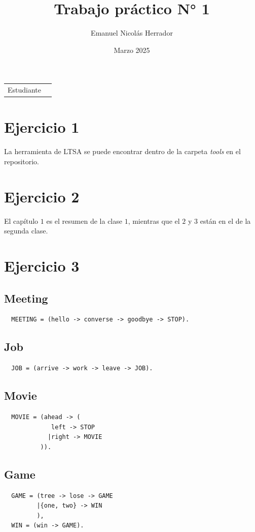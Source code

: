 \documentclass{article}
\title{Trabajo práctico N° 1}
\author{Emanuel Nicolás Herrador}
\date{Marzo 2025}
\begin{document}
\maketitle

\noindent\begin{tabular}{@{}ll}
	Estudiante & \theauthor \\
\end{tabular}

\section*{Ejercicio 1}
La herramienta de LTSA se puede encontrar dentro de la carpeta \textit{tools} en el repositorio.

\section*{Ejercicio 2}
El capítulo $1$ es el resumen de la clase $1$, mientras que el $2$ y $3$ están en el de la segunda clase.

\section*{Ejercicio 3}
\subsection*{Meeting}
\begin{verbatim}
  MEETING = (hello -> converse -> goodbye -> STOP).
\end{verbatim}

\subsection*{Job}
\begin{verbatim}
  JOB = (arrive -> work -> leave -> JOB).
\end{verbatim}

\subsection*{Movie}
\begin{verbatim}
  MOVIE = (ahead -> (
             left -> STOP
            |right -> MOVIE
          )).
\end{verbatim}

\subsection*{Game}
\begin{verbatim}
  GAME = (tree -> lose -> GAME
         |{one, two} -> WIN
         ),
  WIN = (win -> GAME).
\end{verbatim}
\end{document}
